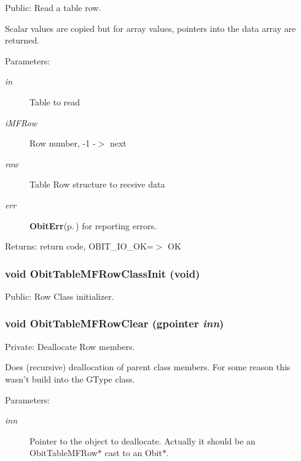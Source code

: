 Public: Read a table row. 

Scalar values are copied but for array values, pointers into the data array are returned. \begin{Desc}
\item[Parameters:]
\begin{description}
\item[{\em in}]Table to read \item[{\em i\-MFRow}]Row number, -1 -$>$ next \item[{\em row}]Table Row structure to receive data \item[{\em err}]{\bf Obit\-Err}{\rm (p.\,\pageref{structObitErr})} for reporting errors. \end{description}
\end{Desc}
\begin{Desc}
\item[Returns:]return code, OBIT\_\-IO\_\-OK=$>$ OK \end{Desc}
\subsubsection{\setlength{\rightskip}{0pt plus 5cm}void Obit\-Table\-MFRow\-Class\-Init (void)}\label{ObitTableMF_8c_a26}


Public: Row Class initializer. 

\subsubsection{\setlength{\rightskip}{0pt plus 5cm}void Obit\-Table\-MFRow\-Clear (gpointer {\em inn})}\label{ObitTableMF_8c_a7}


Private: Deallocate Row members. 

Does (recursive) deallocation of parent class members. For some reason this wasn't build into the GType class. \begin{Desc}
\item[Parameters:]
\begin{description}
\item[{\em inn}]Pointer to the object to deallocate. Actually it should be an Obit\-Table\-MFRow$\ast$ cast to an Obit$\ast$. \end{description}
\end{Desc}
